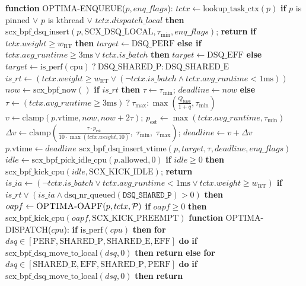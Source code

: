 \documentclass[letterpaper,twocolumn,10pt]{article}
\begin{document}
\begin{algorithm}[t]
\caption{OPTIMA-ENQUEUE \& OPTIMA-DISPATCH}
\label{alg:enqueue}\label{alg:dispatch}
\begin{algorithmic}[1]
\scriptsize\setlength{\itemsep}{0pt}
\STATE \textbf{function} \textsc{OPTIMA-ENQUEUE}($p, enq\_flags$):
\STATE \quad $tctx \leftarrow \text{lookup\_task\_ctx}(p)$
\STATE \quad \textbf{if} $p$ is pinned $\lor$ $p$ is kthread $\lor$ $tctx.dispatch\_local$ \textbf{then}
\STATE \quad \quad $\text{scx\_bpf\_dsq\_insert}(p, \text{SCX\_DSQ\_LOCAL}, \tau_{\min}, enq\_flags)$; \textbf{return}
\STATE \quad \textbf{if} $tctx.weight \ge w_{\mathrm{RT}}$ \textbf{then} $target \leftarrow \text{DSQ\_PERF}$
\STATE \quad \textbf{else if} $tctx.avg\_runtime \ge 3\text{ms} \lor tctx.is\_batch$ \textbf{then} $target \leftarrow \text{DSQ\_EFF}$
\STATE \quad \textbf{else} $target \leftarrow \text{is\_perf}(\text{cpu}) \ ? \ \text{DSQ\_SHARED\_P} : \text{DSQ\_SHARED\_E}$
\STATE \quad $is\_rt \leftarrow (tctx.weight \ge w_{\mathrm{RT}} \lor (\neg tctx.is\_batch \land tctx.avg\_runtime < 1\text{ms}))$
\STATE \quad $now \leftarrow \text{scx\_bpf\_now}()$
\STATE \quad \textbf{if} $is\_rt$ \textbf{then} $\tau \leftarrow \tau_{\min}$; $deadline \leftarrow now$
\STATE \quad \textbf{else}
\STATE \quad \quad $\tau \leftarrow (tctx.avg\_runtime \ge 3\text{ms}) \ ? \ \tau_{\max} : \max(\frac{Q_{\text{base}}}{1+q}, \tau_{\min})$
\STATE \quad \quad $v \leftarrow \mathrm{clamp}(p.\text{vtime}, now, now + 2\tau)$; $p_{\mathrm{est}} \leftarrow \max(tctx.avg\_runtime, \tau_{\min})$
\STATE \quad \quad $\Delta v \leftarrow \mathrm{clamp}\left( \frac{\tau \cdot p_{\mathrm{est}}}{10 \cdot \max(tctx.weight, 10)}, \; \tau_{\min}, \; \tau_{\max} \right)$; $deadline \leftarrow v + \Delta v$
\STATE \quad $p.\text{vtime} \leftarrow deadline$
\STATE \quad $\text{scx\_bpf\_dsq\_insert\_vtime}(p, target, \tau, deadline, enq\_flags)$
\STATE \quad $idle \leftarrow \text{scx\_bpf\_pick\_idle\_cpu}(p.\text{allowed}, 0)$
\STATE \quad \textbf{if} $idle \ge 0$ \textbf{then} $\text{scx\_bpf\_kick\_cpu}(idle, \text{SCX\_KICK\_IDLE})$; \textbf{return}
\STATE \quad $is\_ia \leftarrow (\neg tctx.is\_batch \lor tctx.avg\_runtime < 1\text{ms} \lor tctx.weight \ge w_{\mathrm{RT}})$
\STATE \quad \textbf{if} $is\_rt \lor (is\_ia \land \text{dsq\_nr\_queued}(\texttt{DSQ\_SHARED\_P}) > 0)$ \textbf{then}
\STATE \quad \quad $oapf \leftarrow \textsc{OPTIMA-OAPF}(p, tctx, \mathcal{P})$
\STATE \quad \quad \textbf{if} $oapf \ge 0$ \textbf{then} $\text{scx\_bpf\_kick\_cpu}(oapf, \text{SCX\_KICK\_PREEMPT})$
\STATE \textbf{function} \textsc{OPTIMA-DISPATCH}($cpu$):
\STATE \quad \textbf{if} $\text{is\_perf}(cpu)$ \textbf{then}
\STATE \quad \quad \textbf{for} $dsq \in [\text{PERF}, \text{SHARED\_P}, \text{SHARED\_E}, \text{EFF}]$ \textbf{do}
\STATE \quad \quad \quad \textbf{if} $\text{scx\_bpf\_dsq\_move\_to\_local}(dsq, 0)$ \textbf{then} \textbf{return}
\STATE \quad \textbf{else}
\STATE \quad \quad \textbf{for} $dsq \in [\text{SHARED\_E}, \text{EFF}, \text{SHARED\_P}, \text{PERF}]$ \textbf{do}
\STATE \quad \quad \quad \textbf{if} $\text{scx\_bpf\_dsq\_move\_to\_local}(dsq, 0)$ \textbf{then} \textbf{return}
\end{algorithmic}
\end{algorithm}
\end{document}
